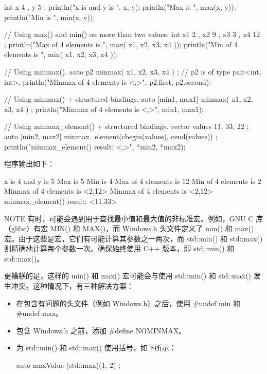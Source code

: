 \begin{cpp}
int x { 4 }, y { 5 };
println("x is {} and y is {}", x, y);
println("Max is {}", max(x, y));
println("Min is {}", min(x, y));

// Using max() and min() on more than two values.
int x1 { 2 }, x2 { 9 }, x3 { 3 }, x4 { 12 };
println("Max of 4 elements is {}", max({ x1, x2, x3, x4 }));
println("Min of 4 elements is {}", min({ x1, x2, x3, x4 }));

// Using minmax().
auto p2 { minmax({ x1, x2, x3, x4 }) }; // p2 is of type pair<int, int>.
println("Minmax of 4 elements is <{},{}>", p2.first, p2.second);

// Using minmax() + structured bindings.
auto [min1, max1] { minmax({ x1, x2, x3, x4 }) };
println("Minmax of 4 elements is <{},{}>", min1, max1);

// Using minmax_element() + structured bindings.
vector values { 11, 33, 22 };
auto [min2, max2] { minmax_element(cbegin(values), cend(values)) };
println("minmax_element() result: <{},{}>", *min2, *max2);
\end{cpp}

程序输出如下：

\begin{shell}
x is 4 and y is 5
Max is 5
Min is 4
Max of 4 elements is 12
Min of 4 elements is 2
Minmax of 4 elements is <2,12>
Minmax of 4 elements is <2,12>
minmax_element() result: <11,33>
\end{shell}

\begin{myNotic}{NOTE}
有时，可能会遇到用于查找最小值和最大值的非标准宏。例如，GNU C 库（glibc）有宏 MIN() 和 MAX()，而 Windows.h 头文件定义了 min() 和 max() 宏。由于这些是宏，它们有可能计算其参数之一两次，而 std::min() 和 std::max() 则精确地计算每个参数一次。确保始终使用 C++ 版本，即 std::min() 和 std::max()。

更糟糕的是，这样的 min() 和 max() 宏可能会与使用 std::min() 和 std::max() 发生冲突。这种情况下，有三种解决方案：

\begin{itemize}
\item
在包含有问题的头文件（例如 Windows.h）之后，使用 \#undef min 和 \#undef max。

\item
包含 Windows.h 之前，添加 \#define NOMINMAX。

\item
为 std::min() 和 std::max() 使用括号，如下所示：

\begin{cpp}
auto maxValue { (std::max)(1, 2) };
\end{cpp}
\end{itemize}
\end{myNotic}

